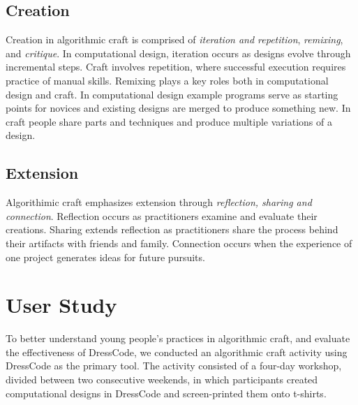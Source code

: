 \documentclass{sigchi}
\begin{document}
\subsection{Creation}
Creation in algorithmic craft is comprised of \emph{iteration and repetition}, \emph{remixing}, and \emph{critique}. In computational design, iteration occurs as designs evolve through incremental steps. Craft involves repetition, where successful execution requires practice of manual skills. Remixing plays a key roles both in computational design and craft. In computational design example programs serve as starting points for novices and existing designs are merged to produce something new. In craft people share parts and techniques and produce multiple variations of a design.

\subsection{Extension}
Algorithimic craft emphasizes extension through \emph{reflection, sharing and connection}. Reflection occurs as practitioners examine and evaluate their creations. Sharing extends reflection as practitioners share the process behind their artifacts with friends and family. Connection occurs when the experience of one project generates ideas for future pursuits.

\section{User Study}
To better understand young people's practices in algorithmic craft, and evaluate the effectiveness of DressCode, we conducted an algorithmic craft activity using DressCode as the primary tool. The activity consisted of a four-day workshop, divided between two consecutive weekends, in which participants created computational designs in DressCode and screen-printed them onto t-shirts.
\end{document}
